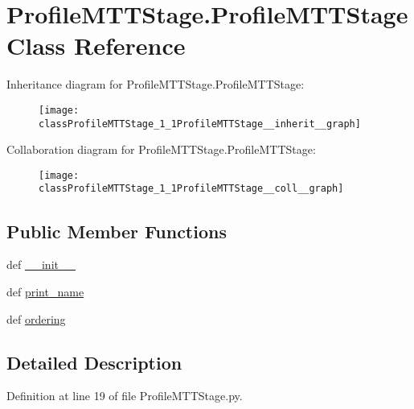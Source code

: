 \hypertarget{classProfileMTTStage_1_1ProfileMTTStage}{\section{Profile\-M\-T\-T\-Stage.\-Profile\-M\-T\-T\-Stage Class Reference}
\label{classProfileMTTStage_1_1ProfileMTTStage}
}


Inheritance diagram for Profile\-M\-T\-T\-Stage.\-Profile\-M\-T\-T\-Stage\-:\nopagebreak
\begin{figure}[H]
\begin{center}
\leavevmode
\texttt{[image: classProfileMTTStage\_1\_1ProfileMTTStage\_\_inherit\_\_graph]}
\end{center}
\end{figure}


Collaboration diagram for Profile\-M\-T\-T\-Stage.\-Profile\-M\-T\-T\-Stage\-:\nopagebreak
\begin{figure}[H]
\begin{center}
\leavevmode
\texttt{[image: classProfileMTTStage\_1\_1ProfileMTTStage\_\_coll\_\_graph]}
\end{center}
\end{figure}
\subsection*{Public Member Functions}
\begin{DoxyCompactItemize}
\item 
def \hyperlink{classProfileMTTStage_1_1ProfileMTTStage_affda81f1516fd358c9db382d0df7e3e5}{\-\_\-\-\_\-init\-\_\-\-\_\-}
\item 
def \hyperlink{classProfileMTTStage_1_1ProfileMTTStage_aeeddf59c2917d8f47537082a227f1796}{print\-\_\-name}
\item 
def \hyperlink{classProfileMTTStage_1_1ProfileMTTStage_a292e50d9049f218d66b7361d3bcb4ab9}{ordering}
\end{DoxyCompactItemize}


\subsection{Detailed Description}


Definition at line 19 of file Profile\-M\-T\-T\-Stage.\-py.




